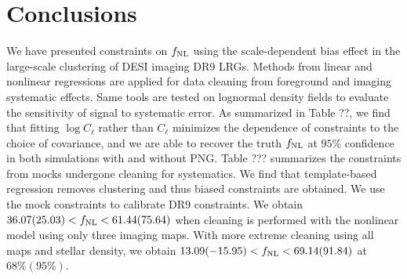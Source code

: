 \section{Conclusions}\label{sec:conclusion}
We have presented constraints on $f_{\rm NL}$ using the scale-dependent bias effect in the large-scale clustering of DESI imaging DR9 LRGs. Methods from linear and nonlinear regressions are applied for data cleaning from foreground and imaging systematic effects. Same tools are tested on lognormal density fields to evaluate the sensitivity of signal to systematic error. As summarized in Table ??, we find that fitting $\log C_{\ell}$ rather than $C_{\ell}$ minimizes the dependence of constraints to the choice of covariance, and we are able to recover the truth $f_{\rm NL}$ at $95\%$ confidence in both simulations with and without PNG. Table ??? summarizes the constraints from mocks undergone cleaning for systematics. We find that template-based regression removes clustering and thus biased constraints are obtained. We use the mock constraints to calibrate DR9 constraints. We obtain $36.07 (25.03) < f_{\rm NL} < 61.44(75.64)$ when cleaning is performed with the nonlinear model using only three imaging maps. With more extreme cleaning using all maps and stellar density, we obtain $13.09(-15.95) < f_{\rm NL} < 69.14(91.84)$ at $68\% (95\%)$.  

